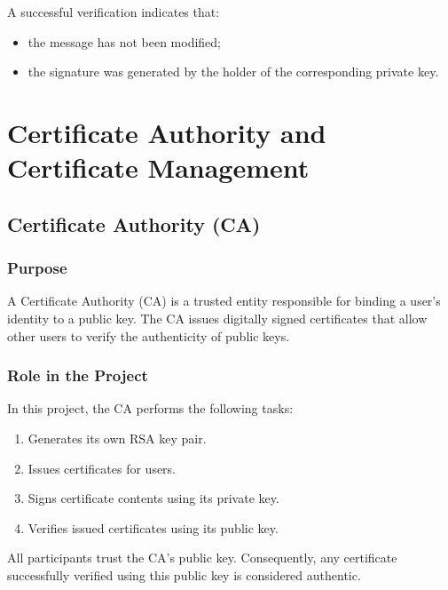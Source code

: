\documentclass[12pt]{article}
\begin{document}
A successful verification indicates that:

\begin{itemize}
\item the message has not been modified;
\item the signature was generated by the holder of the corresponding private key.
\end{itemize}
\newpage

\section{Certificate Authority and Certificate Management}


\subsection{Certificate Authority (CA)}

\subsubsection{Purpose}

A Certificate Authority (CA) is a trusted entity responsible for binding a
user's identity to a public key. The CA issues digitally signed certificates
that allow other users to verify the authenticity of public keys.

\subsubsection{Role in the Project}

In this project, the CA performs the following tasks:

\begin{enumerate}
\item Generates its own RSA key pair.
\item Issues certificates for users.
\item Signs certificate contents using its private key.
\item Verifies issued certificates using its public key.
\end{enumerate}

All participants trust the CA's public key. Consequently, any certificate
successfully verified using this public key is considered authentic.
\end{document}
